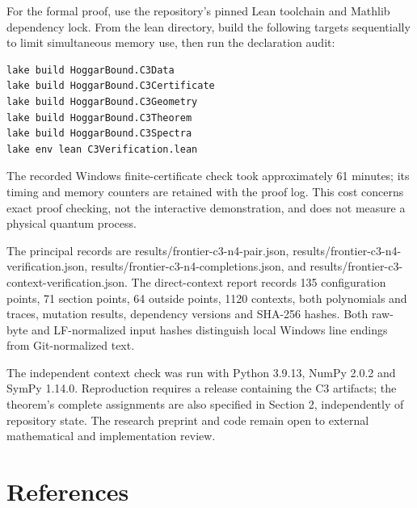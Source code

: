 \documentclass[11pt,letterpaper]{article}
\begin{document}
For the formal proof, use the repository's pinned Lean toolchain and Mathlib dependency lock. From the lean directory, build the following targets sequentially to limit simultaneous memory use, then run the declaration audit:

\begin{samepage}\begin{verbatim}
lake build HoggarBound.C3Data
lake build HoggarBound.C3Certificate
lake build HoggarBound.C3Geometry
lake build HoggarBound.C3Theorem
lake build HoggarBound.C3Spectra
lake env lean C3Verification.lean
\end{verbatim}\end{samepage}

The recorded Windows finite-certificate check took approximately 61 minutes; its timing and memory counters are retained with the proof log. This cost concerns exact proof checking, not the interactive demonstration, and does not measure a physical quantum process.

The principal records are results/frontier-c3-n4-pair.json, results/frontier-c3-n4-verification.json, results/frontier-c3-n4-completions.json, and results/frontier-c3-context-verification.json. The direct-context report records 135 configuration points, 71 section points, 64 outside points, 1120 contexts, both polynomials and traces, mutation results, dependency versions and SHA-256 hashes. Both raw-byte and LF-normalized input hashes distinguish local Windows line endings from Git-normalized text.

The independent context check was run with Python 3.9.13, NumPy 2.0.2 and SymPy 1.14.0. Reproduction requires a release containing the C3 artifacts; the theorem's complete assignments are also specified in Section 2, independently of repository state. The research preprint and code remain open to external mathematical and implementation review.

\section{References}\label{references}
\end{document}
